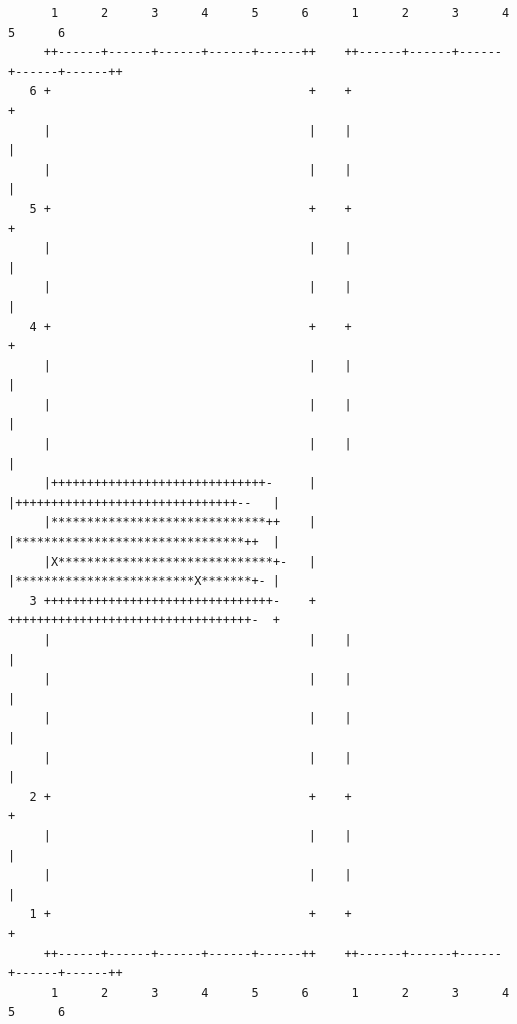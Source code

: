 \begin{center}
\begin{boxedminipage}{6.5in}
\begin{small}
\begin{tt}
\begin{verbatim}
      1      2      3      4      5      6      1      2      3      4      5      6
     ++------+------+------+------+------++    ++------+------+------+------+------++
   6 +                                    +    +                                    +
     |                                    |    |                                    |
     |                                    |    |                                    |
   5 +                                    +    +                                    +
     |                                    |    |                                    |
     |                                    |    |                                    |
   4 +                                    +    +                                    +
     |                                    |    |                                    |
     |                                    |    |                                    |
     |                                    |    |                                    |
     |++++++++++++++++++++++++++++++-     |    |+++++++++++++++++++++++++++++++--   |
     |******************************++    |    |********************************++  |
     |X******************************+-   |    |*************************X*******+- |
   3 ++++++++++++++++++++++++++++++++-    +    ++++++++++++++++++++++++++++++++++-  +
     |                                    |    |                                    |
     |                                    |    |                                    |
     |                                    |    |                                    |
     |                                    |    |                                    |
   2 +                                    +    +                                    +
     |                                    |    |                                    |
     |                                    |    |                                    |
   1 +                                    +    +                                    +
     ++------+------+------+------+------++    ++------+------+------+------+------++   
      1      2      3      4      5      6      1      2      3      4      5      6

\end{verbatim}
\end{tt}
\end{small}
\end{boxedminipage}
\end{center}
